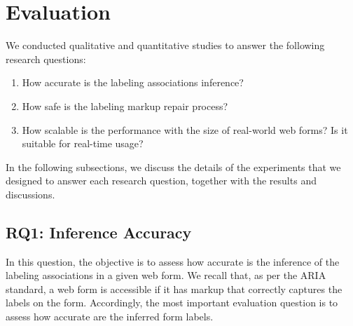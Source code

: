 \section{Evaluation}

\label{sec:evaluation}
We conducted qualitative and quantitative studies  
to answer the following research questions:

\begin{enumerate}[label=\textbf{RQ\arabic*},leftmargin=*]
	\item How accurate is the labeling associations inference? 

	\item How safe is the labeling markup repair process?
	
	\item How scalable is the performance with the size of 
	real-world web forms? Is it suitable for real-time usage?
\end{enumerate}

In the following subsections, we discuss the details of the experiments that 
we designed to answer each research question, together with the results and discussions.

\subsection{RQ1: Inference Accuracy}\label{subsec:rq1}
In this question, the objective is to assess how accurate 
is the inference of the labeling associations in a given web form. 
We recall that, as per the ARIA standard, a web form is accessible 
if it has markup that correctly captures the labels on the form. 
Accordingly, the most important evaluation question is to 
assess how accurate are the inferred form labels. 

